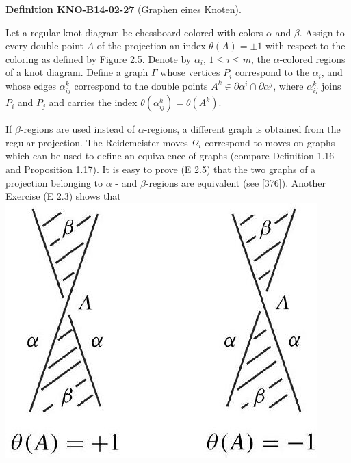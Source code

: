 \documentclass[10pt, letterpaper]{article}
\newcommand{\CustomHeading}[3]{%
  \par\medskip\noindent%
  \textbf{#1 #2} \textnormal{(#3)}.\enskip%
}
\newenvironment{DEF}[2]{\CustomHeading{Definition}{#1}{#2}}{}
\begin{document}
\begin{DEF}{KNO-B14-02-27}{Graphen eines Knoten}
Let a regular knot diagram be chessboard colored with colors $\alpha$ and $\beta$. Assign to every double point $A$ of the projection an index $\theta(A)= \pm 1$ with respect to the coloring as defined by Figure 2.5. Denote by $\alpha_{i}$, $1 \leq i \leq m$, the $\alpha$-colored regions of a knot diagram. Define a graph $\Gamma$ whose vertices $P_{i}$ correspond to the $\alpha_{i}$, and whose edges $\alpha_{i j}^{k}$ correspond to the double points $A^{k} \in \partial \alpha^{i} \cap \partial \alpha^{j}$, where $\alpha_{i j}^{k}$ joins $P_{i}$ and $P_{j}$ and carries the index $\theta\left(\alpha_{i j}^{k}\right)=\theta\left(A^{k}\right)$.

If $\beta$-regions are used instead of $\alpha$-regions, a different graph is obtained from the regular projection. The Reidemeister moves $\Omega_{i}$ correspond to moves on graphs which can be used to define an equivalence of graphs (compare Definition 1.16 and Proposition 1.17). It is easy to prove (E 2.5) that the two graphs of a projection belonging to $\alpha$ - and $\beta$-regions are equivalent (see [376]). Another Exercise (E 2.3) shows that\\
\includegraphics[scale=0.2, center]{2025_05_21_9c06be8de7a55410f8c1g-032}


\end{DEF}
\end{document}
